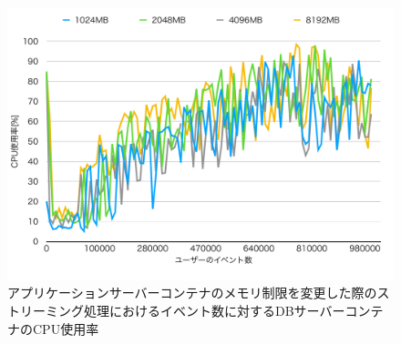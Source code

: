 \documentclass[../../../../../main]{subfiles}
\begin{document}
    \begin{figure}[H]
        \centering
        \includegraphics[width=12cm]{graph}
        \caption{アプリケーションサーバーコンテナのメモリ制限を変更した際のストリーミング処理におけるイベント数に対するDBサーバーコンテナのCPU使用率}
        \label{fig:stream-change-app-memory-limit-db-cpu-app_4_db_1_1024}
    \end{figure}
\end{document}
